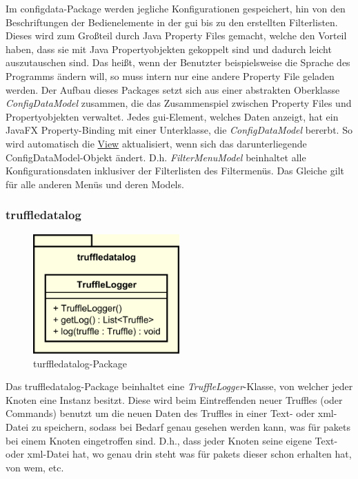     \medskip
    Im configdata-Package werden jegliche Konfigurationen gespeichert, hin von den
    Beschriftungen der Bedienelemente in der \gls{gui} bis zu den erstellten Filterlisten. Dieses
    wird zum Großteil durch Java Property Files gemacht, welche den Vorteil haben, dass
    sie mit Java Propertyobjekten gekoppelt sind und dadurch leicht auszutauschen sind.
    Das heißt, wenn der Benutzter beispielsweise die Sprache des Programms ändern
    will, so muss intern nur eine andere Property File geladen werden.
    \newline
    \newline
    Der Aufbau dieses Packages setzt sich aus einer abstrakten Oberklasse
    \textit{ConfigDataModel} zusammen, die das Zusammenspiel zwischen Property Files
    und Propertyobjekten verwaltet. Jedes \gls{gui}-Element, welches Daten anzeigt, hat
    ein JavaFX Property-Binding mit einer Unterklasse, die \textit{ConfigDataModel}
    bererbt. So wird automatisch die \hyperref[subsec:view]{View} aktualisiert,
    wenn sich das darunterliegende ConfigDataModel-Objekt ändert. D.h.
    \textit{FilterMenuModel} beinhaltet alle Konfigurationsdaten inklusiver der
    Filterlisten des Filtermenüs. Das Gleiche gilt für alle anderen Menüs und
    deren Models.


    \subsubsection{truffledatalog}
    \label{subsubsec:graphlog}

    \begin{figure}[H]
      \centering
      \includegraphics[width=0.5\textwidth]{../diagramimages/truffledatalog.png}
      \caption{turffledatalog-Package}
    \end{figure}

    \medskip
    Das truffledatalog-Package beinhaltet eine \textit{TruffleLogger}-Klasse, von
    welcher jeder Knoten eine Instanz besitzt. Diese wird beim Eintreffenden neuer Truffles
    (oder Commands) benutzt um die neuen Daten des Truffles in einer Text- oder xml-Datei zu speichern,
    sodass bei Bedarf genau gesehen werden kann, was für \glspl{paket} bei einem
    Knoten eingetroffen sind. D.h., dass jeder Knoten seine eigene Text- oder xml-Datei
    hat, wo genau drin steht was für \glspl{paket} dieser schon erhalten hat,
    von wem, etc.

